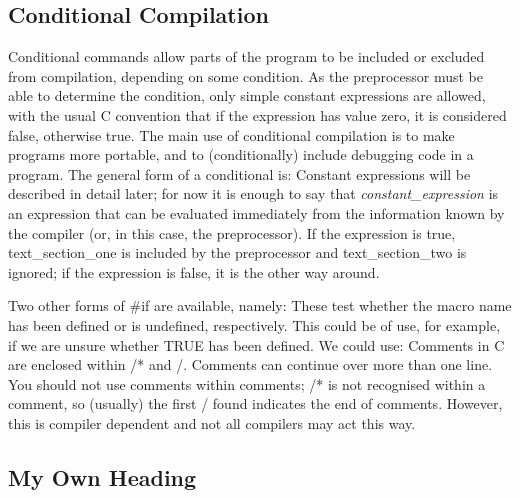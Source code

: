      

\subsection{Conditional Compilation}

     Conditional commands  allow parts  of  the  program  to  be 
included  or excluded from  compilation, depending  on some 
condition. As the preprocessor must be  able to determine the
condition, only simple constant expressions are allowed, with the
usual C convention that if the expression has value zero, it is
considered false, otherwise true. The main use of conditional
compilation is to make programs more portable, and to (conditionally)
include debugging code in a program.  The general form of a
conditional is:
Constant expressions will be described in detail later; for now it is
enough to say that {\em constant\_expression\/} is an expression that can be
evaluated immediately from  the   information  known   by  the 
compiler  (or,  in  this  case,  the preprocessor). If  the
expression  is true,  {\ms text\_section\_one\/} is included by
the preprocessor  and {\ms text\_section\_two\/}  is ignored; if
the  expression  is false, it is the other way around.

Two other forms of {\cd \#if} are available, namely:
These test  whether the  macro name  has been  defined or  is 
undefined, respectively. This could be of use, for example, if we are
unsure whether {\cd TRUE} has been defined. We could use:
Comments in  C are  enclosed within  {\cd /*} and {\cd */}.  Comments
can continue over more than one line. You should not use comments within
comments; {\cd /*} is not recognised within a comment,
so (usually) the first {\cd */} found indicates the end of comments. 
However, this is compiler dependent and not all compilers may act
this way.

\subsection{My Own Heading}

